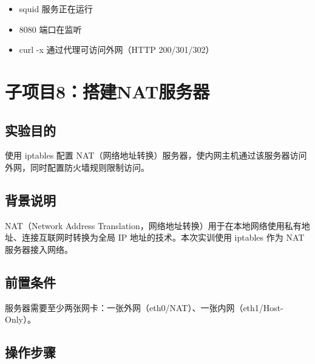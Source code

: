 \documentclass[12pt,a4paper]{ctexart}
\begin{document}
\begin{itemize}
  \item squid 服务正在运行
  \item 8080 端口在监听
  \item curl -x 通过代理可访问外网（HTTP 200/301/302）
\end{itemize}

\newpage
\section{子项目8：搭建NAT服务器}

\subsection{实验目的}

使用 iptables 配置 NAT（网络地址转换）服务器，使内网主机通过该服务器访问外网，同时配置防火墙规则限制访问。

\subsection{背景说明}

NAT（Network Address Translation，网络地址转换）用于在本地网络使用私有地址、连接互联网时转换为全局 IP 地址的技术。本次实训使用 iptables 作为 NAT 服务器接入网络。

\subsection{前置条件}

服务器需要至少两张网卡：一张外网（eth0/NAT）、一张内网（eth1/Host-Only）。

\subsection{操作步骤}
\end{document}

